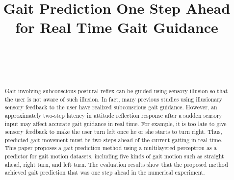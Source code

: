 \documentclass{sigchi}
\def\plaintitle{Gait Prediction One Step Ahead \\ for Real Time Gait Guidance}
\begin{document}
\title{\plaintitle}

\author{%
  \\
  \\
  \\
}

\maketitle

\begin{abstract}

Gait involving subconscious postural reflex can be guided using sensory illusion so that the user is not aware of such illusion. In fact, many previous studies using illusionary sensory feedback to the user have realized subconscious gait guidance. However, an approximately two-step latency in attitude reflection response after a sudden sensory input may affect accurate gait guidance in real time\cite{1492799}. For example, it is too late to give sensory feedback to make the user turn left once he or she starts to turn right. Thus, predicted gait movement must be two steps ahead of the current gaiting in real time. This paper proposes a gait prediction method using a multilayered perceptron as a predictor for gait motion datasets, including five kinds of gait motion such as straight ahead, right turn, and left turn. The evaluation results show that the proposed method achieved gait prediction that was one step ahead in the numerical experiment.

\end{abstract}

 
\end{document}

